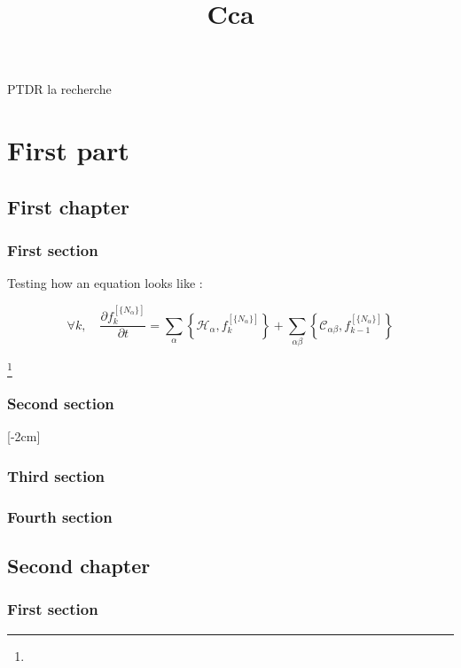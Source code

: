 \documentclass{researchbook}
\title{Cca}
\theoremstyle{plain}
\theoremstyle{definition}
\theoremstyle{remark}
\begin{document}
\dominitoc%



\maketitle
\newpage

PTDR la recherche

\tableofcontents


\part{First part}
\chapter{First chapter}

\section{First section}

Testing how an equation looks like : 

\[
\forall k, \quad \frac{\partial f^{[\{N_\alpha\}]}_{k}}{\partial t} = \sum_\alpha\left\{\mathcal{H}_\alpha, f^{[\{N_\alpha\}]}_k\right\} + \sum_{\alpha\beta} \left\{\mathcal{C}_{\alpha\beta}, f^{[\{N_\alpha\}]}_{k-1}\right\}
\]
\lipsum

\footnote{\lipsum}

\section{Second section}\lipsum
\reversemarginpar{}[-2cm]
\section{Third section}\lipsum
\section{Fourth section}\lipsum

\chapter{Second chapter}

\section{First section}\lipsum
\end{document}
